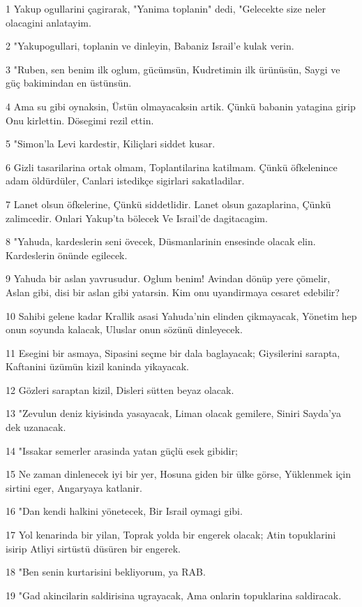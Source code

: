 \par 1 Yakup ogullarini çagirarak, "Yanima toplanin" dedi, "Gelecekte size neler olacagini anlatayim.
\par 2 "Yakupogullari, toplanin ve dinleyin, Babaniz Israil'e kulak verin.
\par 3 "Ruben, sen benim ilk oglum, gücümsün, Kudretimin ilk ürünüsün, Saygi ve güç bakimindan en üstünsün.
\par 4 Ama su gibi oynaksin, Üstün olmayacaksin artik. Çünkü babanin yatagina girip Onu kirlettin. Dösegimi rezil ettin.
\par 5 "Simon'la Levi kardestir, Kiliçlari siddet kusar.
\par 6 Gizli tasarilarina ortak olmam, Toplantilarina katilmam. Çünkü öfkelenince adam öldürdüler, Canlari istedikçe sigirlari sakatladilar.
\par 7 Lanet olsun öfkelerine, Çünkü siddetlidir. Lanet olsun gazaplarina, Çünkü zalimcedir. Onlari Yakup'ta bölecek Ve Israil'de dagitacagim.
\par 8 "Yahuda, kardeslerin seni övecek, Düsmanlarinin ensesinde olacak elin. Kardeslerin önünde egilecek.
\par 9 Yahuda bir aslan yavrusudur. Oglum benim! Avindan dönüp yere çömelir, Aslan gibi, disi bir aslan gibi yatarsin. Kim onu uyandirmaya cesaret edebilir?
\par 10 Sahibi gelene kadar Krallik asasi Yahuda'nin elinden çikmayacak, Yönetim hep onun soyunda kalacak, Uluslar onun sözünü dinleyecek.
\par 11 Esegini bir asmaya, Sipasini seçme bir dala baglayacak; Giysilerini sarapta, Kaftanini üzümün kizil kaninda yikayacak.
\par 12 Gözleri saraptan kizil, Disleri sütten beyaz olacak.
\par 13 "Zevulun deniz kiyisinda yasayacak, Liman olacak gemilere, Siniri Sayda'ya dek uzanacak.
\par 14 "Issakar semerler arasinda yatan güçlü esek gibidir;
\par 15 Ne zaman dinlenecek iyi bir yer, Hosuna giden bir ülke görse, Yüklenmek için sirtini eger, Angaryaya katlanir.
\par 16 "Dan kendi halkini yönetecek, Bir Israil oymagi gibi.
\par 17 Yol kenarinda bir yilan, Toprak yolda bir engerek olacak; Atin topuklarini isirip Atliyi sirtüstü düsüren bir engerek.
\par 18 "Ben senin kurtarisini bekliyorum, ya RAB.
\par 19 "Gad akincilarin saldirisina ugrayacak, Ama onlarin topuklarina saldiracak.
